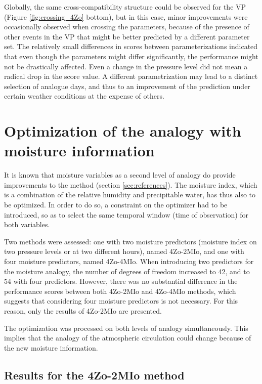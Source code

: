 \documentclass[review]{elsarticle}
\begin{document}
Globally, the same cross-compatibility structure could be observed for the VP (Figure \ref{fig:crossing_4Zo} bottom), but in this case, minor improvements were occasionally observed when crossing the parameters, because of the presence of other events in the VP that might be better predicted by a different parameter set. The relatively small differences in scores between parameterizations indicated that even though the parameters might differ significantly, the performance might not be drastically affected. Even a change in the pressure level did not mean a radical drop in the score value. A different parametrization may lead to a distinct selection of analogue days, and thus to an improvement of the prediction under certain weather conditions at the expense of others.


\section{Optimization of the analogy with moisture information}
\label{sec:optim_moisture}

It is known that moisture variables as a second level of analogy do provide improvements to the method (section \ref{sec:references}). The moisture index, which is a combination of the relative humidity and precipitable water, has thus also to be optimized. In order to do so, a constraint on the optimizer had to be introduced, so as to select the same temporal window (time of observation) for both variables. 

Two methods were assessed: one with two moisture predictors (moisture index on two pressure levels or at two different hours), named 4Zo-2MIo, and one with four moisture predictors, named 4Zo-4MIo. When introducing two predictors for the moisture analogy, the number of degrees of freedom increased to 42, and to 54 with four predictors. However, there was no substantial difference in the performance scores between both 4Zo-2MIo and 4Zo-4MIo methods, which suggests that considering four moisture predictors is not necessary. For this reason, only the results of 4Zo-2MIo are presented.

The optimization was processed on both levels of analogy simultaneously. This implies that the analogy of the atmospheric circulation could change because of the new moisture information.


\subsection{Results for the 4Zo-2MIo method}
\end{document}
